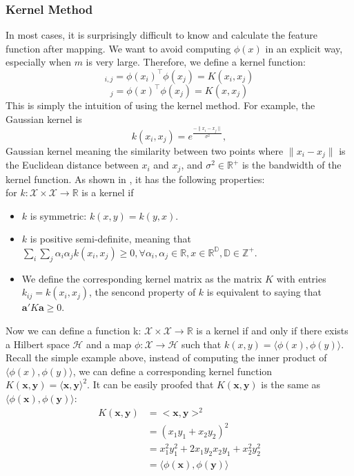 \subsubsection{Kernel Method}
In most cases, it is surprisingly difficult to know and calculate the feature function after mapping. We want to avoid computing $\phi(x)$ in an explicit way, 
especially when $m$ is very large. Therefore, we define a kernel function:
\begin{equation*}
    [\Phi\Phi^\top]_{i,j}=\phi(x_i)^\top \phi(x_j)=K(x_i,x_j)
\end{equation*}
\begin{equation}
    [\phi(x)^\top\Phi^\top]_j=\phi(x)^\top\phi(x_j)=K(x,x_j)
\end{equation}
This is simply the intuition of using the kernel method. For example, the Gaussian kernel is
\begin{equation*}
    k(x_i, x_j) = e^\frac{-\parallel x_i - x_j \parallel}{\sigma^2},
\end{equation*}
Gaussian kernel meaning the similarity between two points where $\parallel x_i - x_j \parallel$ is the Euclidean distance between $x_i$ and $x_j$, and $\sigma^2 \in \mathbb{R}^+$ is the bandwidth of the kernel function. As shown in \citet{hofmann2008kernel}, it has the following properties:\\
for $k: \mathcal{X} \times \mathcal{X} \rightarrow \mathbb{R}$ is a kernel if
\begin{itemize}
    \item $k$ is symmetric: $k(x,y) = k(y,x)$.
    \item $k$ is positive semi-definite, meaning that $\sum_{i} \sum_{j} \alpha_i \alpha_j k(x_i,x_j)\geq0, \forall \alpha_i, \alpha_j \in \mathbb{R}, x \in \mathbb{R}^\mathbb{D}, \mathbb{D} \in \mathbb{Z}^+$. 
    \item We define the corresponding kernel matrix as the matrix $K$ with entries $k_{ij}=k(x_i,x_j)$, the sencond property of $k$ is equivalent to saying that $\textbf{a}'K \textbf{a}\geq 0$.
\end{itemize}
Now we can define a function k: $\mathcal{X} \times \mathcal{X}  \rightarrow \mathbb{R}$ is a kernel if and 
only if there exists a Hilbert space $\mathcal{H}$ and a map $\phi: \mathcal{X}\rightarrow\mathcal{H}$ such that $k(x,y)=\langle\phi(x),\phi(y)\rangle$. \\
Recall the simple example above, instead of computing the inner product of $\langle\phi(x),\phi(y)\rangle$, we can define 
a corresponding kernel function $K(\textbf{x},\textbf{y})=\langle\textbf{x},\textbf{y}\rangle^2$. It can be easily proofed that $K(\textbf{x},\textbf{y})$ is the same as $\langle\phi(\textbf{x}),\phi(\textbf{y})\rangle$:
\begin{align*}
    K(\textbf{x},\textbf{y})&=<\textbf{x},\textbf{y}>^2\\
                            &=(x_1y_1+x_2y_2)^2\\
                            &=x_1^2y_1^2+2x_1y_2x_2y_1+x_2^2y_2^2\\
                            &=\langle\phi(\textbf{x}),\phi(\textbf{y})\rangle
\end{align*}

